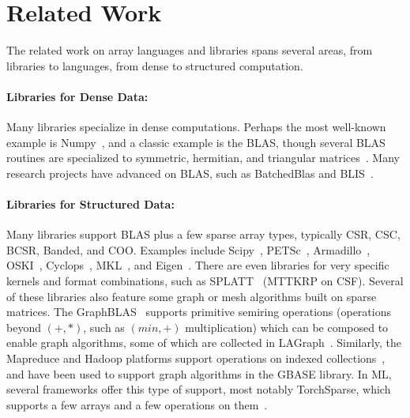 \section{Related Work}

The related work on array languages and libraries spans several areas, from libraries to languages, from dense to structured computation.

\paragraph{Libraries for Dense Data:}
Many libraries specialize in dense computations.
%
Perhaps the most well-known example is Numpy~\cite{harris_array_2020},
and a classic example is the BLAS, though several BLAS routines are specialized to symmetric, hermitian, and triangular matrices~\cite{Anderson1999}. 
%
Many research projects have advanced on BLAS, such as BatchedBlas and BLIS~\cite{dongarra2017design, van2015blis}.

\paragraph{Libraries for Structured Data:}

Many libraries support BLAS plus a few sparse array types, typically CSR, CSC, BCSR, Banded, and COO.
%
Examples include Scipy~\cite{virtanen2020scipy}, PETSc~\cite{abhyankarpetsc}, Armadillo~\cite{Rumengan2021}, OSKI~\cite{vuduc2005oski}, Cyclops~\cite{solomonik2013cyclops}, MKL~\cite{noauthor_developer_2024}, and Eigen~\cite{eigenweb}.
%
There are even libraries for very specific kernels and format combinations, such as SPLATT~\cite{smith2015splatt} (MTTKRP on CSF).
%
Several of these libraries also feature some graph or mesh algorithms built on sparse matrices.
%
The GraphBLAS~\cite{kepner2016mathematical} supports primitive semiring operations (operations beyond $(+, *)$, such as $(min, +)$ multiplication) which can be composed to enable graph algorithms, some of which are collected in LAGraph~\cite{mattson2019lagraph}.
%
Similarly, the Mapreduce and Hadoop platforms support operations on indexed collections~\cite{dean_mapreduce_2008}, and have been used to support graph
algorithms in the GBASE library\cite{kang2011gbase}.
%
In ML, several frameworks offer this type of support, most notably TorchSparse, which supports a few arrays and a few operations on them~\cite{tang2022torchsparse, tang2023torchsparse++}.
%
